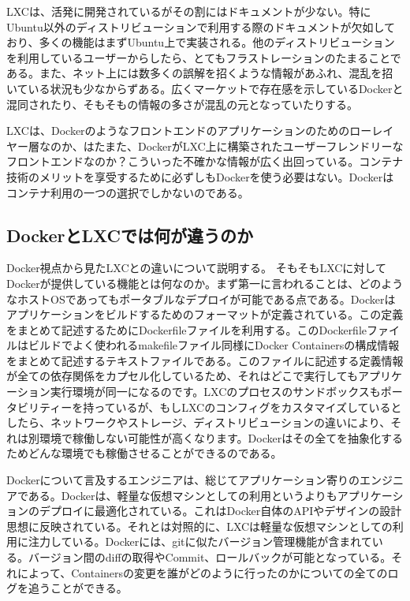 ﻿\documentclass[9pt,b5paper,tombo,openany]{jsbook}
\begin{document}
LXCは、活発に開発されているがその割にはドキュメントが少ない。特にUbuntu以外のディストリビューションで利用する際のドキュメントが欠如しており、多くの機能はまずUbuntu上で実装される。他のディストリビューションを利用しているユーザーからしたら、とてもフラストレーションのたまることである。また、ネット上には数多くの誤解を招くような情報があふれ、混乱を招いている状況も少なからずある。広くマーケットで存在感を示しているDockerと混同されたり、そもそもの情報の多さが混乱の元となっていたりする。

LXCは、Dockerのようなフロントエンドのアプリケーションのためのローレイヤー層なのか、はたまた、DockerがLXC上に構築されたユーザーフレンドリーなフロントエンドなのか？こういった不確かな情報が広く出回っている。コンテナ技術のメリットを享受するために必ずしもDockerを使う必要はない。Dockerはコンテナ利用の一つの選択でしかないのである。

\subsection{DockerとLXCでは何が違うのか}
Docker視点から見たLXCとの違いについて説明する。
そもそもLXCに対してDockerが提供している機能とは何なのか。まず第一に言われることは、どのようなホストOSであってもポータブルなデプロイが可能である点である。Dockerはアプリケーションをビルドするためのフォーマットが定義されている。この定義をまとめて記述するためにDockerfileファイルを利用する。このDockerfileファイルはビルドでよく使われるmakefileファイル同様にDocker Containersの構成情報をまとめて記述するテキストファイルである。このファイルに記述する定義情報が全ての依存関係をカプセル化しているため、それはどこで実行してもアプリケーション実行環境が同一になるのです。LXCのプロセスのサンドボックスもポータビリティーを持っているが、もしLXCのコンフィグをカスタマイズしているとしたら、ネットワークやストレージ、ディストリビューションの違いにより、それは別環境で稼働しない可能性が高くなります。Dockerはその全てを抽象化するためどんな環境でも稼働させることができるのである。

Dockerについて言及するエンジニアは、総じてアプリケーション寄りのエンジニアである。Dockerは、軽量な仮想マシンとしての利用というよりもアプリケーションのデプロイに最適化されている。これはDocker自体のAPIやデザインの設計思想に反映されている。それとは対照的に、LXCは軽量な仮想マシンとしての利用に注力している。Dockerには、gitに似たバージョン管理機能が含まれている。バージョン間のdiffの取得やCommit、ロールバックが可能となっている。それによって、Containersの変更を誰がどのように行ったのかについての全てのログを追うことができる。
\end{document}
